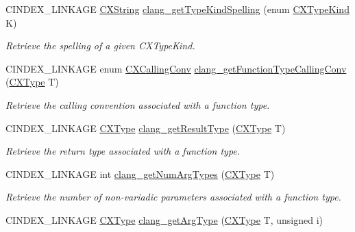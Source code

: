 \begin{DoxyCompactItemize}
\mbox{\label{group__CINDEX__TYPES_ga6bd7b366d998fc67f4178236398d0666}} 
C\+I\+N\+D\+E\+X\+\_\+\+L\+I\+N\+K\+A\+GE \mbox{\hyperlink{structCXString}{C\+X\+String}} \mbox{\hyperlink{group__CINDEX__TYPES_ga6bd7b366d998fc67f4178236398d0666}{clang\+\_\+get\+Type\+Kind\+Spelling}} (enum \mbox{\hyperlink{group__CINDEX__TYPES_gaad39de597b13a18882c21860f92b095a}{C\+X\+Type\+Kind}} K)
\begin{DoxyCompactList}\small\item\em Retrieve the spelling of a given C\+X\+Type\+Kind. \end{DoxyCompactList}\item 
C\+I\+N\+D\+E\+X\+\_\+\+L\+I\+N\+K\+A\+GE enum \mbox{\hyperlink{group__CINDEX__TYPES_ga4a0e941ec7b4b64bf9eb3d0ed49d55ae}{C\+X\+Calling\+Conv}} \mbox{\hyperlink{group__CINDEX__TYPES_gae3392567fa1e69d3921785723f06ce55}{clang\+\_\+get\+Function\+Type\+Calling\+Conv}} (\mbox{\hyperlink{structCXType}{C\+X\+Type}} T)
\begin{DoxyCompactList}\small\item\em Retrieve the calling convention associated with a function type. \end{DoxyCompactList}\item 
C\+I\+N\+D\+E\+X\+\_\+\+L\+I\+N\+K\+A\+GE \mbox{\hyperlink{structCXType}{C\+X\+Type}} \mbox{\hyperlink{group__CINDEX__TYPES_ga39b4850746f39e17c6b8b4eef3154d85}{clang\+\_\+get\+Result\+Type}} (\mbox{\hyperlink{structCXType}{C\+X\+Type}} T)
\begin{DoxyCompactList}\small\item\em Retrieve the return type associated with a function type. \end{DoxyCompactList}\item 
C\+I\+N\+D\+E\+X\+\_\+\+L\+I\+N\+K\+A\+GE int \mbox{\hyperlink{group__CINDEX__TYPES_ga705e1a4ed7c7595606fc30ed5d2a6b5a}{clang\+\_\+get\+Num\+Arg\+Types}} (\mbox{\hyperlink{structCXType}{C\+X\+Type}} T)
\begin{DoxyCompactList}\small\item\em Retrieve the number of non-\/variadic parameters associated with a function type. \end{DoxyCompactList}\item 
C\+I\+N\+D\+E\+X\+\_\+\+L\+I\+N\+K\+A\+GE \mbox{\hyperlink{structCXType}{C\+X\+Type}} \mbox{\hyperlink{group__CINDEX__TYPES_ga67f60ba4831b1bfd90ab0c1c12adab27}{clang\+\_\+get\+Arg\+Type}} (\mbox{\hyperlink{structCXType}{C\+X\+Type}} T, unsigned i)

\end{DoxyCompactItemize}
